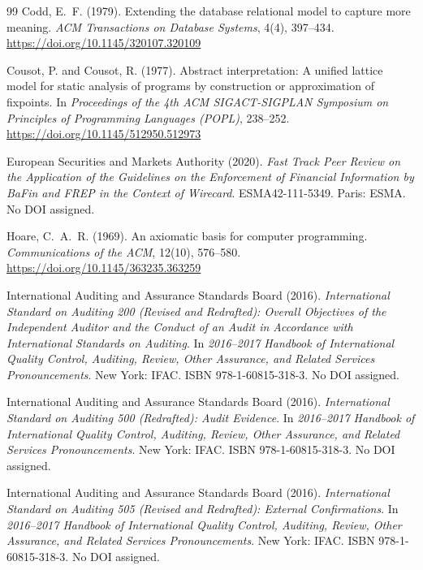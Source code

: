 \documentclass[smallcondensed,envcountsect,natbib]{svjour3}
\begin{document}
\begin{thebibliography}{99}
Codd, E.~F. (1979).
Extending the database relational model to capture more meaning.
\emph{ACM Transactions on Database Systems}, 4(4), 397--434. \url{https://doi.org/10.1145/320107.320109}

Cousot, P. and Cousot, R. (1977).
Abstract interpretation: A unified lattice model for static analysis of programs by construction or approximation of fixpoints.
In \emph{Proceedings of the 4th ACM SIGACT-SIGPLAN Symposium on Principles of Programming Languages (POPL)}, 238--252. \url{https://doi.org/10.1145/512950.512973}

European Securities and Markets Authority (2020).
\emph{Fast Track Peer Review on the Application of the Guidelines on the Enforcement of Financial Information by BaFin and FREP in the Context of Wirecard}.
ESMA42-111-5349. Paris: ESMA. No DOI assigned.

Hoare, C.~A.~R. (1969).
An axiomatic basis for computer programming.
\emph{Communications of the ACM}, 12(10), 576--580. \url{https://doi.org/10.1145/363235.363259}

International Auditing and Assurance Standards Board (2016).
\emph{International Standard on Auditing 200 (Revised and Redrafted): Overall Objectives of the Independent Auditor and the Conduct of an Audit in Accordance with International Standards on Auditing}.
In \emph{2016--2017 Handbook of International Quality Control, Auditing, Review, Other Assurance, and Related Services Pronouncements}. New York: IFAC. ISBN 978-1-60815-318-3. No DOI assigned.

International Auditing and Assurance Standards Board (2016).
\emph{International Standard on Auditing 500 (Redrafted): Audit Evidence}.
In \emph{2016--2017 Handbook of International Quality Control, Auditing, Review, Other Assurance, and Related Services Pronouncements}. New York: IFAC. ISBN 978-1-60815-318-3. No DOI assigned.

International Auditing and Assurance Standards Board (2016).
\emph{International Standard on Auditing 505 (Revised and Redrafted): External Confirmations}.
In \emph{2016--2017 Handbook of International Quality Control, Auditing, Review, Other Assurance, and Related Services Pronouncements}. New York: IFAC. ISBN 978-1-60815-318-3. No DOI assigned.


\end{thebibliography}
\end{document}
